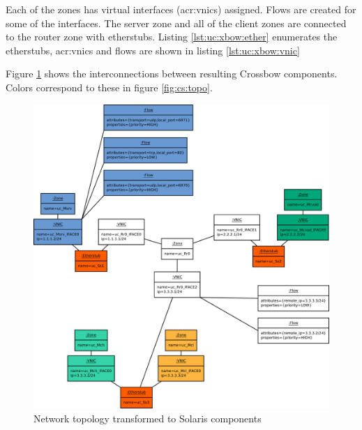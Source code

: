 \documentclass[11pt,openany]{book}
\begin{document}
        Each of the zones has virtual interfaces (\gls{acr:vnic}s) assigned. Flows are created for some of the interfaces. The
        server zone and all of the client zones are connected to the router zone with etherstubs. Listing
        \ref{lst:uc:xbow:ether} enumerates the etherstubs, \gls{acr:vnic}s and flows are shown in listing \ref{lst:uc:xbow:vnic} \\

        \noindent
        \begin{minipage}{\textwidth}
          
        \end{minipage}

        \noindent
        \begin{minipage}{\textwidth}
          
        \end{minipage}

        Figure \ref{fig:cs:topo-xbow} shows the interconnections between resulting Crossbow components. Colors
        correspond to these in figure \ref{fig:cs:topo}.

        \begin{figure}[H]
          \centering
          \includegraphics[width=.9\textwidth]{img/test-case/topology-xbow.pdf}

          \caption{Network topology transformed to Solaris components}
          \label{fig:cs:topo-xbow}
        \end{figure}
\end{document}
